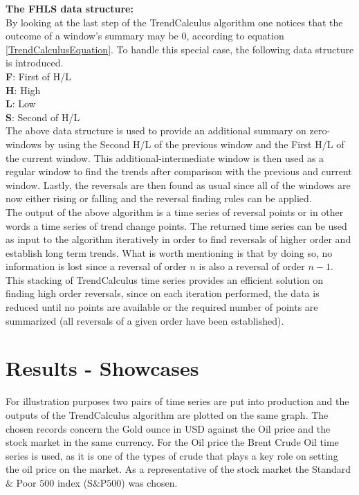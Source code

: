 \documentclass[a4, 11pt]{article}
\begin{document}
\textbf{The FHLS data structure:}\\
By looking at the last step of the TrendCalculus algorithm one notices that the outcome of a window's summary may be $0$, according to equation \ref{TrendCalculusEquation}. To handle this special case, the following data structure is introduced. \\
\textbf{F}: First of H/L\\
\textbf{H}: High\\
\textbf{L}: Low\\
\textbf{S}: Second of H/L\\[2ex]
The above data structure is used to provide an additional summary on zero-windows by using the Second H/L of the previous window and the First H/L of the current window. This additional-intermediate window is then used as a regular window to find the trends after comparison with the previous and current window. Lastly, the reversals are then found as usual since all of the windows are now either rising or falling and the reversal finding rules can be applied. \\[2ex]
The output of the above algorithm is a time series of reversal points or in other words a time series of trend change points. The returned time series can be used as input to the algorithm iteratively in order to find reversals of higher order and establish long term trends. What is worth mentioning is that by doing so, no information is lost since a reversal of order $n$ is also a reversal of order $n-1$. This stacking of TrendCalculus time series provides an efficient solution on finding high order reversals, since on each iteration performed, the data is reduced until no points are available or the required number of points are summarized (all reversals of a given order have been established). 


\section{Results - Showcases}
For illustration purposes two pairs of time series are put into production and the outputs of the TrendCalculus algorithm are plotted on the same graph. The chosen records concern the Gold ounce in USD against the Oil price and the stock market in the same currency. For the Oil price the Brent Crude Oil time series is used, as it is one of the types of crude that plays a key role on setting the oil price on the market. As a representative of the stock market the Standard $\&$ Poor $500$ index (S$\&$P$500$) was chosen. 
\end{document}
